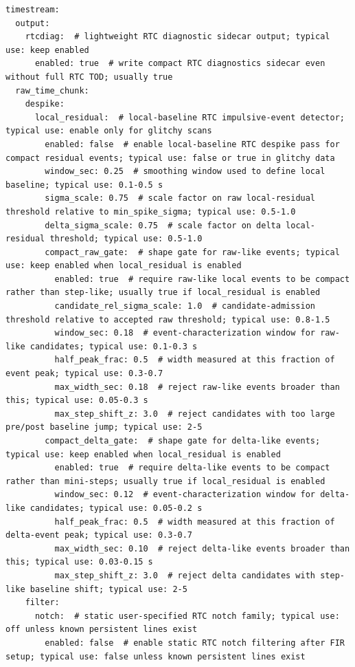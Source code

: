 \documentclass[11pt]{article}
\begin{document}
\begin{lstlisting}[language={}]
timestream:
  output:
    rtcdiag:  # lightweight RTC diagnostic sidecar output; typical use: keep enabled
      enabled: true  # write compact RTC diagnostics sidecar even without full RTC TOD; usually true
  raw_time_chunk:
    despike:
      local_residual:  # local-baseline RTC impulsive-event detector; typical use: enable only for glitchy scans
        enabled: false  # enable local-baseline RTC despike pass for compact residual events; typical use: false or true in glitchy data
        window_sec: 0.25  # smoothing window used to define local baseline; typical use: 0.1-0.5 s
        sigma_scale: 0.75  # scale factor on raw local-residual threshold relative to min_spike_sigma; typical use: 0.5-1.0
        delta_sigma_scale: 0.75  # scale factor on delta local-residual threshold; typical use: 0.5-1.0
        compact_raw_gate:  # shape gate for raw-like events; typical use: keep enabled when local_residual is enabled
          enabled: true  # require raw-like local events to be compact rather than step-like; usually true if local_residual is enabled
          candidate_rel_sigma_scale: 1.0  # candidate-admission threshold relative to accepted raw threshold; typical use: 0.8-1.5
          window_sec: 0.18  # event-characterization window for raw-like candidates; typical use: 0.1-0.3 s
          half_peak_frac: 0.5  # width measured at this fraction of event peak; typical use: 0.3-0.7
          max_width_sec: 0.18  # reject raw-like events broader than this; typical use: 0.05-0.3 s
          max_step_shift_z: 3.0  # reject candidates with too large pre/post baseline jump; typical use: 2-5
        compact_delta_gate:  # shape gate for delta-like events; typical use: keep enabled when local_residual is enabled
          enabled: true  # require delta-like events to be compact rather than mini-steps; usually true if local_residual is enabled
          window_sec: 0.12  # event-characterization window for delta-like candidates; typical use: 0.05-0.2 s
          half_peak_frac: 0.5  # width measured at this fraction of delta-event peak; typical use: 0.3-0.7
          max_width_sec: 0.10  # reject delta-like events broader than this; typical use: 0.03-0.15 s
          max_step_shift_z: 3.0  # reject delta candidates with step-like baseline shift; typical use: 2-5
    filter:
      notch:  # static user-specified RTC notch family; typical use: off unless known persistent lines exist
        enabled: false  # enable static RTC notch filtering after FIR setup; typical use: false unless known persistent lines exist

\end{lstlisting}
\end{document}
